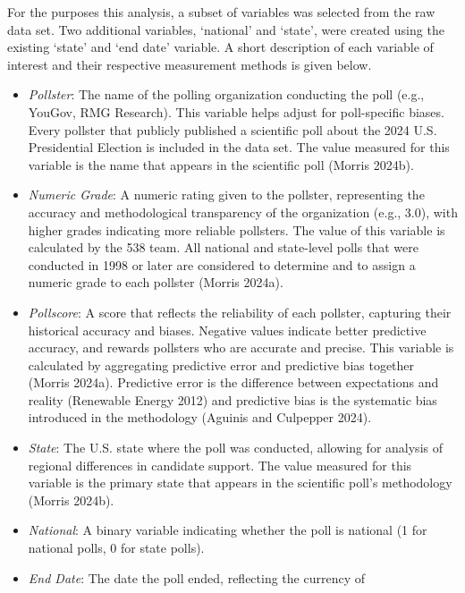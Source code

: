 \documentclass[
  letterpaper,
  DIV=11,
  numbers=noendperiod]{scrartcl}
\begin{document}
\vspace{0.7cm}

For the purposes this analysis, a subset of variables was selected from
the raw data set. Two additional variables, `national' and `state', were
created using the existing `state' and `end date' variable. A short
description of each variable of interest and their respective
measurement methods is given below.

\begin{itemize}
\item
  \emph{Pollster}: The name of the polling organization conducting the
  poll (e.g., YouGov, RMG Research). This variable helps adjust for
  poll-specific biases. Every pollster that publicly published a
  scientific poll about the 2024 U.S. Presidential Election is included
  in the data set. The value measured for this variable is the name that
  appears in the scientific poll (Morris 2024b).
\item
  \emph{Numeric Grade}: A numeric rating given to the pollster,
  representing the accuracy and methodological transparency of the
  organization (e.g., 3.0), with higher grades indicating more reliable
  pollsters. The value of this variable is calculated by the 538 team.
  All national and state-level polls that were conducted in 1998 or
  later are considered to determine and to assign a numeric grade to
  each pollster (Morris 2024a).
\item
  \emph{Pollscore}: A score that reflects the reliability of each
  pollster, capturing their historical accuracy and biases. Negative
  values indicate better predictive accuracy, and rewards pollsters who
  are accurate and precise. This variable is calculated by aggregating
  predictive error and predictive bias together (Morris 2024a).
  Predictive error is the difference between expectations and reality
  (Renewable Energy 2012) and predictive bias is the systematic bias
  introduced in the methodology (Aguinis and Culpepper 2024).
\item
  \emph{State}: The U.S. state where the poll was conducted, allowing
  for analysis of regional differences in candidate support. The value
  measured for this variable is the primary state that appears in the
  scientific poll's methodology (Morris 2024b).
\item
  \emph{National}: A binary variable indicating whether the poll is
  national (1 for national polls, 0 for state polls).
\item
  \emph{End Date}: The date the poll ended, reflecting the currency of

\end{itemize}
\end{document}
